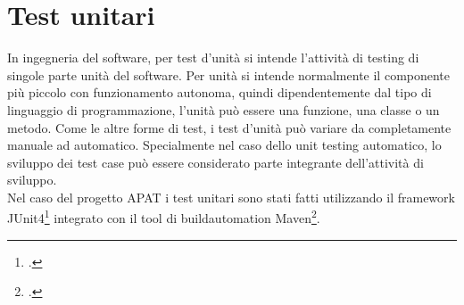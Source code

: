 \section{Test unitari}\label{sec:test-unitari}
In ingegneria del software, per test d'unità si intende l'attività di testing di singole parte unità del software.
Per unità si intende normalmente il componente più piccolo con funzionamento autonoma, quindi dipendentemente dal tipo di linguaggio di programmazione, l'unità può essere una funzione, una classe o un metodo.
Come le altre forme di test, i test d'unità può variare da completamente manuale ad automatico.
Specialmente nel caso dello unit testing automatico, lo sviluppo dei test case può essere considerato parte integrante dell'attività di sviluppo.\\

Nel caso del progetto APAT i test unitari sono stati fatti utilizzando il framework JUnit4\footcite{site:junit4} integrato con il tool di \gls{buildautomation} Maven\footcite{site:maven}.
\setcounter{rowcount}{0}

